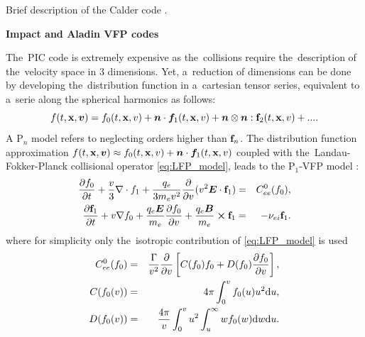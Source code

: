 Brief description of the Calder code .

\textbf{Impact and Aladin VFP codes}

The~PIC code is extremely expensive as the~collisions require the~description 
of the~velocity space in 3 dimensions. Yet, a~reduction of dimensions can be 
done by developing the~distribution function in a~cartesian tensor series, 
equivalent to a~serie along the spherical harmonics \cite{Johnston_PR1960}
as follows: %
\begin{equation}
  f(t,\mathbf{x},\boldsymbol{v}) = f_0(t,\mathbf{x},v) 
  + \boldsymbol{n}\cdot \boldsymbol{f}_1(t,\mathbf{x},v)
  +\boldsymbol{n}\otimes\boldsymbol{n}:\mathbf{f}_2(t,\mathbf{x},v)+... .
  \label{Pn}
\end{equation}
A P$_n$ model refers to 
neglecting orders higher than $\mathbf{f}_n$. The distribution function 
approximation $f(t,\mathbf{x},\boldsymbol{v})\approx f_0(t,\mathbf{x},v)
+\boldsymbol{n}\cdot \boldsymbol{f}_1(t,\mathbf{x},v)$ coupled with 
the~Landau-Fokker-Planck collisional operator 
\eqref{eq:LFP_model}, leads to the P$_1$-VFP model 
\cite{Johnston_PR1960, Kingham_JCP2004}:
\begin{eqnarray}
\frac{\partial f_0}{\partial t}+\frac{v}{3}\nabla \cdot f_1
+\frac{q_e}{3m_ev^2}\frac{\partial}{\partial v}(v^2\boldsymbol{E}\cdot \mathbf{f}_1)
&=&
C^0_{ee}(f_0) ,
 \label{eq:P1f0_Aladin}\\
\frac{\partial \mathbf{f}_1}{\partial t}+v\nabla f_0
+ \frac{q_e\boldsymbol{E}}{m_e}\frac{\partial f_0}{\partial v}
+\frac{q_e\boldsymbol{B}}{m_e}\boldsymbol{\times} \mathbf{f}_1 
&=&
- \nu_{ei}\mathbf{f}_1 .
\label{eq:P1f1_Aladin}
\end{eqnarray}
where for simplicity only the~isotropic 
contribution of \eqref{eq:LFP_model} is used 
\begin{eqnarray} 
C^0_{ee}(f_0) &=& \frac{\Gamma}{v^2}\frac{\partial}{\partial v}
\left[C(f_0)f_0+D(f_0)\frac{\partial f_0}{\partial v}\right] ,
\\
C(f_0(v)) &=& 4\pi\int_0^v f_0(u) u^2 \text{d} u ,
\\
D(f_0(v)) &=& \frac{4\pi}{v}\int_0^v u^2\int_u^\infty w f_0(w) 
\text{d} w \text{d} u .
\end{eqnarray}

